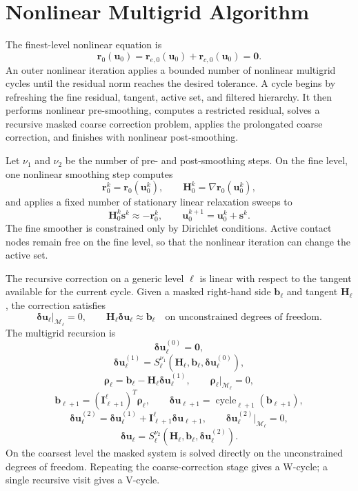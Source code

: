 \documentclass[11pt]{article}
\newcommand{\calM}{\mathcal{M}}
\newcommand{\ud}{\boldsymbol{u}}
\newcommand{\du}{\boldsymbol{\delta u}}
\newcommand{\rr}{\boldsymbol{r}}
\newcommand{\bb}{\boldsymbol{b}}
\newcommand{\HH}{\boldsymbol{H}}
\newcommand{\II}{\boldsymbol{I}}
\begin{document}
\section{Nonlinear Multigrid Algorithm}
\label{sec:mg}

The finest-level nonlinear equation is
\[
    \rr_0(\ud_0)=\rr_{e,0}(\ud_0)+\rr_{c,0}(\ud_0)=\boldsymbol{0}.
\]
An outer nonlinear iteration applies a bounded number of nonlinear multigrid
cycles until the residual norm reaches the desired tolerance.  A cycle begins
by refreshing the fine residual, tangent, active set, and filtered hierarchy.
It then performs nonlinear pre-smoothing, computes a restricted residual,
solves a recursive masked coarse correction problem, applies the prolongated
coarse correction, and finishes with nonlinear post-smoothing.

Let $\nu_1$ and $\nu_2$ be the number of pre- and post-smoothing steps.  On
the fine level, one nonlinear smoothing step computes
\[
    \rr_0^k=\rr_0(\ud_0^k),
    \qquad
    \HH_0^k=\nabla\rr_0(\ud_0^k),
\]
and applies a fixed number of stationary linear relaxation sweeps to
\[
    \HH_0^k\boldsymbol{s}^k\approx -\rr_0^k,
    \qquad
    \ud_0^{k+1}=\ud_0^k+\boldsymbol{s}^k .
\]
The fine smoother is constrained only by Dirichlet conditions.  Active contact
nodes remain free on the fine level, so that the nonlinear iteration can
change the active set.

The recursive correction on a generic level $\ell$ is linear with respect to
the tangent available for the current cycle.  Given a masked right-hand side
$\bb_\ell$ and tangent $\HH_\ell$, the correction satisfies
\[
    \du_\ell|_{\calM_\ell}=0,
    \qquad
    \HH_\ell\du_\ell \approx \bb_\ell
    \quad\text{on unconstrained degrees of freedom}.
\]
The multigrid recursion is
\[
    \du_\ell^{(0)}=\boldsymbol{0},
\]
\[
    \du_\ell^{(1)}
    =
    S_\ell^{\nu_1}(\HH_\ell,\bb_\ell,\du_\ell^{(0)}),
\]
\[
    \boldsymbol{\rho}_\ell
    =
    \bb_\ell-\HH_\ell\du_\ell^{(1)},
    \qquad
    \boldsymbol{\rho}_\ell|_{\calM_\ell}=0,
\]
\[
    \bb_{\ell+1}
    =
    (\II_{\ell+1}^{\ell})^T\boldsymbol{\rho}_\ell,
    \qquad
    \du_{\ell+1}
    =
    \operatorname{cycle}_{\ell+1}(\bb_{\ell+1}),
\]
\[
    \du_\ell^{(2)}
    =
    \du_\ell^{(1)}
    +
    \II_{\ell+1}^{\ell}\du_{\ell+1},
    \qquad
    \du_\ell^{(2)}|_{\calM_\ell}=0,
\]
\[
    \du_\ell
    =
    S_\ell^{\nu_2}(\HH_\ell,\bb_\ell,\du_\ell^{(2)}).
\]
On the coarsest level the masked system is solved directly on the
unconstrained degrees of freedom.  Repeating the coarse-correction stage gives
a W-cycle; a single recursive visit gives a V-cycle.
\end{document}
